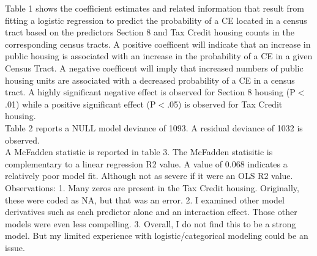 \documentclass{article}\usepackage[]{graphicx}\usepackage[]{color}
\begin{document}
Table 1 shows the coefficient estimates and related information that result from fitting a logistic regression to predict the probability of a CE located in a census tract based on the predictors Section 8 and Tax Credit housing counts in the corresponding census tracts. A positive coefficent will indicate that an increase in public housing is associated with an increase in the probability of a CE in a given Census Tract. A negative coefficent will imply that increased numbers of public housing units are associated with a decreased probability of a CE in a census tract. A highly significant negative effect is observed for Section 8 housing (P$<$.01) while a positive significant effect (P$<$.05) is observed for Tax Credit housing.\\

Table 2 reports a NULL model deviance of 1093. A residual deviance of 1032 is observed.\\ 

A McFadden statistic is reported in table 3. The McFadden statisitic is complementary to a linear regression R2 value. A value of 0.068 indicates a relatively poor model fit. Although not as severe if it were an OLS R2 value.\\  

Observations: 1. Many zeros are present in the Tax Credit housing. Originally, these were coded as NA, but that was an error. 2. I examined other model derivatives such as each predictor alone and an interaction effect. Those other models were even less compelling. 3. Overall, I do not find this to be a strong model. But my limited experience with logistic/categorical modeling could be an issue. 


\pagebreak
\newpage
\FloatBarrier
\end{document}
